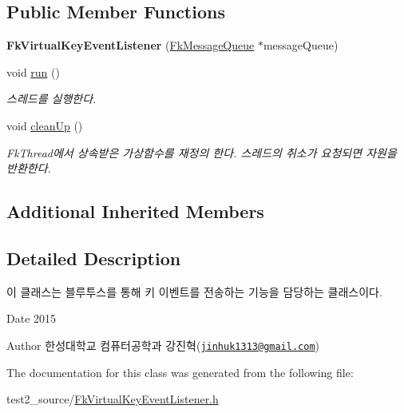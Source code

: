 \subsection*{Public Member Functions}
\begin{DoxyCompactItemize}
\item 
\hypertarget{class_fk_virtual_key_event_listener_a694588e0f0f23db90873b619493ce2eb}{}{\bfseries Fk\+Virtual\+Key\+Event\+Listener} (\hyperlink{class_fk_message_queue}{Fk\+Message\+Queue} $\ast$message\+Queue)\label{class_fk_virtual_key_event_listener_a694588e0f0f23db90873b619493ce2eb}

\item 
\hypertarget{class_fk_virtual_key_event_listener_ac9f0aec13d180c1efe7be26a7e5836c3}{}void \hyperlink{class_fk_virtual_key_event_listener_ac9f0aec13d180c1efe7be26a7e5836c3}{run} ()\label{class_fk_virtual_key_event_listener_ac9f0aec13d180c1efe7be26a7e5836c3}

\begin{DoxyCompactList}\small\item\em 스레드를 실행한다. \end{DoxyCompactList}\item 
\hypertarget{class_fk_virtual_key_event_listener_ab8b3d6748f8118d1e329c32c91f1de89}{}void \hyperlink{class_fk_virtual_key_event_listener_ab8b3d6748f8118d1e329c32c91f1de89}{clean\+Up} ()\label{class_fk_virtual_key_event_listener_ab8b3d6748f8118d1e329c32c91f1de89}

\begin{DoxyCompactList}\small\item\em Fk\+Thread에서 상속받은 가상함수를 재정의 한다. 스레드의 취소가 요청되면 자원을 반환한다. \end{DoxyCompactList}\end{DoxyCompactItemize}
\subsection*{Additional Inherited Members}


\subsection{Detailed Description}
이 클래스는 블루투스를 통해 키 이벤트를 전송하는 기능을 담당하는 클래스이다. 

\begin{DoxyDate}{Date}
2015 
\end{DoxyDate}
\begin{DoxyAuthor}{Author}
한성대학교 컴퓨터공학과 강진혁(\href{mailto:jinhuk1313@gmail.com}{\tt jinhuk1313@gmail.\+com}) 
\end{DoxyAuthor}


The documentation for this class was generated from the following file\+:\begin{DoxyCompactItemize}
\item 
test2\+\_\+source/\hyperlink{_fk_virtual_key_event_listener_8h}{Fk\+Virtual\+Key\+Event\+Listener.\+h}\end{DoxyCompactItemize}
